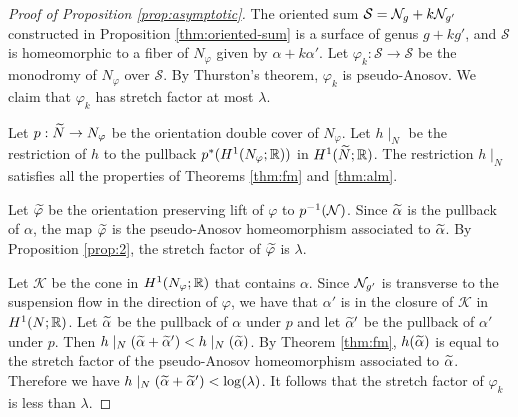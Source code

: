 \begin{proof}[Proof of Proposition \ref{prop:asymptotic}]
The oriented sum $\mathcal{S}=\mathcal{N}_g+k\mathcal{N}_{g'}$ constructed in Proposition \ref{thm:oriented-sum} is a surface of genus $g+kg'$, and $\mathcal{S}$ is homeomorphic to a fiber of $N_\varphi$ given by $\alpha+k\alpha'$.  Let $\varphi_{k}:\mathcal{S}\rightarrow\mathcal{S}$ be the monodromy of $N_\varphi$ over $\mathcal{S}$.  By Thurston's theorem, $\varphi_k$ is pseudo-Anosov.  We claim that $\varphi_k$ has stretch factor at most $\lambda$.


Let $p:\widetilde{N}\rightarrow N_\varphi$ be the orientation double cover of $N_\varphi$. Let $h\mid_{N}$ be the restriction of $h$ to the pullback  $p^\ast(H^1(N_\varphi; \mathbb{R}))$ in $H^1(\widetilde{N}; \mathbb{R})$.
The restriction $h\mid_N$ satisfies all the properties of Theorems \ref{thm:fm} and \ref{thm:alm}.

 Let $\widetilde{\varphi}$ be the orientation preserving lift of $\varphi$ to $p^{-1}(\mathcal{N})$.  Since $\widetilde{\alpha}$ is the pullback of $\alpha$, the map $\widetilde{\varphi}$ is the pseudo-Anosov homeomorphism associated to $\widetilde{\alpha}$.  By Proposition \ref{prop:2}, the stretch factor of $\widetilde{\varphi}$ is $\lambda$.

Let $\mathcal{K}$ be the cone in $H^1(N_\varphi;\mathbb{R})$ that contains $\alpha$.  Since $\mathcal{N}_{g'}$ is transverse to the suspension flow in the direction of $\varphi$, we have that $\alpha'$ is in the closure of $\mathcal{K}$ in $H^1(N;\mathbb{R})$.  Let $\widetilde{\alpha}$ be the pullback of $\alpha$ under $p$ and let $\widetilde{\alpha}'$ be the pullback of $\alpha'$ under $p$.  Then $h\mid_N(\widetilde{\alpha}+\widetilde{\alpha}')<h\mid_N(\widetilde{\alpha})$.  By Theorem \ref{thm:fm}, $h(\widetilde{\alpha})$ is equal to the stretch factor of the pseudo-Anosov homeomorphism associated to $\widetilde{\alpha}$.  Therefore we have $h\mid_N(\widetilde{\alpha}+\widetilde{\alpha}')<\log(\lambda)$. It follows that the stretch factor of $\varphi_k$ is less than $\lambda$.
\end{proof}
